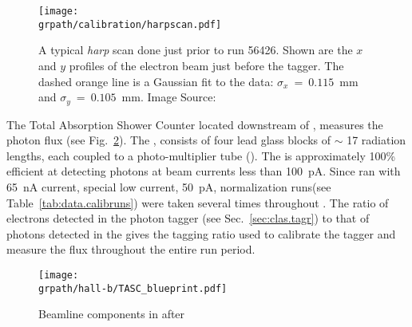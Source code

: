 
\begin{figure}\begin{center}
\texttt{[image: \\grpath/calibration/harpscan.pdf]}
\caption[A typical \emph{harp} scan done just prior to run 56426]{\label{fig:clas.beam.harpscan}{}A typical \emph{harp} scan done just prior to run 56426. Shown are the $x$ and $y$ profiles of the electron beam just before the tagger. The dashed orange line is a Gaussian fit to the data: $\sigma_x~=~0.115$~mm and $\sigma_y~=~0.105$~mm. Image Source:~\cite{goetz}}
\end{center}\end{figure}

The Total Absorption Shower Counter located downstream of , measures the photon flux (see Fig.~\ref{fig:clas.beam.afterCLAS}). The , consists of four lead glass blocks of $\sim$ 17 radiation lengths, each coupled to a photo-multiplier tube (\label{abbr:pmt}). The  is approximately 100\% efficient at detecting photons at beam currents less than 100~pA\cite{clas.tagger,clas.tagger.calib}. Since  ran with 65~nA current, special low current, 50~pA, normalization runs(see Table~\ref{tab:data.calibruns}) were taken several times throughout . The ratio of electrons detected in the photon tagger (see Sec.~\ref{sec:clas.tagr}) to that of photons detected in the  gives the tagging ratio used to calibrate the tagger and measure the flux throughout the entire  run period.
\begin{figure}[h!]\begin{center}
\texttt{[image: \\grpath/hall-b/TASC\_blueprint.pdf]}
\caption[Beamline and components after  ]{\label{fig:clas.beam.afterCLAS}{}Beamline components in  after }
\end{center}\end{figure}

\FloatBarrier